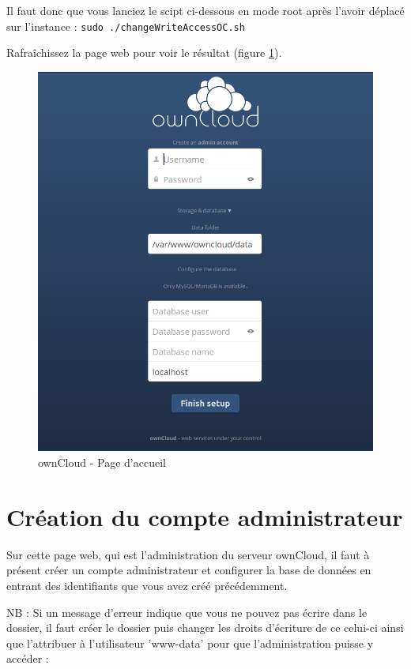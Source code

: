 Il faut donc que vous lanciez le scipt ci-dessous en mode root après l'avoir déplacé sur l'instance : \texttt{sudo ./changeWriteAccessOC.sh}



Rafraîchissez la page web pour voir le résultat (figure \ref{ocwelcomepage}).

\begin{figure}[h]
  \centering
    \includegraphics[width=0.8\linewidth]{img/OCWelcomePage.png}
  \caption{ownCloud - Page d'accueil}
  \label{ocwelcomepage}
\end{figure}

\clearpage
\section{Création du compte administrateur}

Sur cette page web, qui est l'administration du serveur ownCloud, il faut à présent créer un compte administrateur et configurer la base de données en entrant des identifiants que vous avez créé précédemment.

\vspace{0.4cm}

\noindent NB : Si un message d'erreur indique que vous ne pouvez pas écrire dans le dossier, il faut créer le dossier puis changer les droits d'écriture de ce celui-ci ainsi que l'attribuer à l'utilisateur 'www-data' pour que l'administration puisse y accéder : \\

